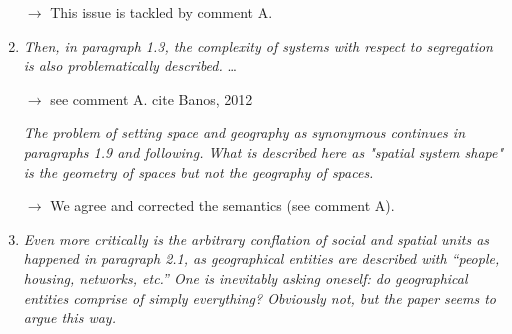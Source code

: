 \documentclass[11pt,a4paper,sans]{moderncv}        %
\begin{document}
\begin{enumerate}
 $\rightarrow$ This issue is tackled by comment A.
 
 \medskip

  

  \item \textit{Then, in paragraph 1.3, the complexity of systems with respect to segregation is also problematically described.} \ldots
  
  $\rightarrow$ see comment A. cite Banos, 2012 

  \medskip

  \textit{The problem of setting space and geography as synonymous continues in paragraphs 1.9 and following. What is described here as "spatial system shape" is the geometry of spaces but not the geography of spaces.}
  
  $\rightarrow$ We agree and corrected the semantics (see comment A). 

  \medskip

  \item \textit{Even more critically is the arbitrary conflation of social and spatial units as happened in paragraph 2.1, as geographical entities are described with “people, housing, networks, etc.” One is inevitably asking oneself: do geographical entities comprise of simply everything? Obviously not, but the paper seems to argue this way.}
  

\end{enumerate}
\end{document}
